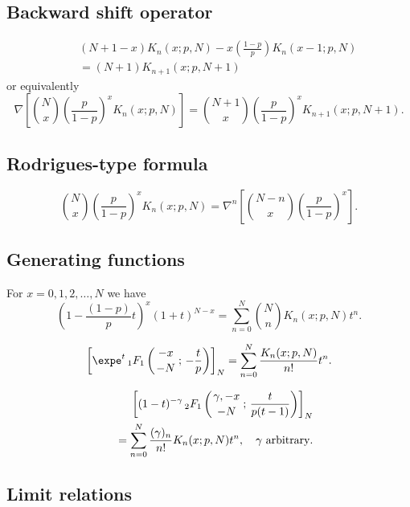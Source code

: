 \documentclass[envcountchap,graybox]{svmono}
\newcommand{\hyp}[5]{\mbox{}_{#1}{F}_{#2}
\left(\genfrac{}{}{0pt}{}{#3}{#4}\,;\,#5\right)}
\begin{document}
\subsection*{Backward shift operator}
\begin{eqnarray}
\label{shift2KrawtchoukI}
& &(N+1-x)K_n(x;p,N)-x\left(\frac{1-p}{p}\right)K_n(x-1;p,N)\nonumber\\
& &{}=(N+1)K_{n+1}(x;p,N+1)
\end{eqnarray}
or equivalently
\begin{equation}
\label{shift2KrawtchoukII}
\nabla\left[\binom{N}{x}\left(\frac{p}{1-p}\right)^xK_n(x;p,N)\right]=
\binom{N+1}{x}\left(\frac{p}{1-p}\right)^xK_{n+1}(x;p,N+1).
\end{equation}

\subsection*{Rodrigues-type formula}
\begin{equation}
\label{RodKrawtchouk}
\binom{N}{x}\left(\frac{p}{1-p}\right)^xK_n(x;p,N)=
\nabla^n\left[\binom{N-n}{x}\left(\frac{p}{1-p}\right)^x\right].
\end{equation}

\subsection*{Generating functions}
For $x=0,1,2,\ldots,N$ we have
\begin{equation}
\label{GenKrawtchouk1}
\left(1-\frac{(1-p)}{p}t\right)^x(1+t)^{N-x}=
\sum_{n=0}^N\binom{N}{n}K_n(x;p,N)t^n.
\end{equation}

\begin{equation}
\label{GenKrawtchouk2}
\left[\expe^t\,\hyp{1}{1}{-x}{-N}{-\frac{t}{p}}\right]_N=
\sum_{n=0}^N\frac{K_n(x;p,N)}{n!}t^n.
\end{equation}

\begin{eqnarray}
\label{GenKrawtchouk3}
& &\left[(1-t)^{-\gamma}\,\hyp{2}{1}{\gamma,-x}{-N}{\frac{t}{p(t-1)}}\right]_N\nonumber\\
& &{}=\sum_{n=0}^N\frac{(\gamma)_n}{n!}K_n(x;p,N)t^n,
\quad\textrm{$\gamma$ arbitrary}.
\end{eqnarray}

\subsection*{Limit relations}
\end{document}
